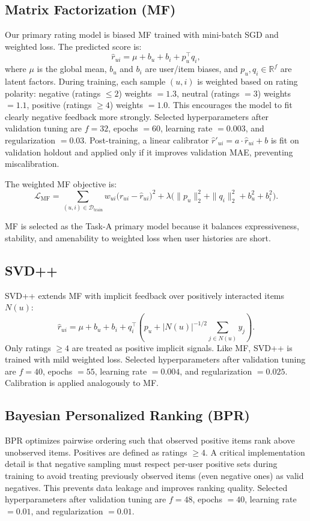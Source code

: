 \documentclass[sigconf,nonacm]{acmart}
\begin{document}
\subsection{Matrix Factorization (MF)}
Our primary rating model is biased MF trained with mini-batch SGD and weighted loss. The predicted score is:
\begin{equation}
\hat{r}_{ui} = \mu + b_u + b_i + p_u^\top q_i,
\end{equation}
where $\mu$ is the global mean, $b_u$ and $b_i$ are user/item biases, and $p_u, q_i \in \mathbb{R}^f$ are latent factors. During training, each sample $(u,i)$ is weighted based on rating polarity: negative (ratings $\le 2$) weights $=1.3$, neutral (ratings $=3$) weights $=1.1$, positive (ratings $\ge 4$) weights $=1.0$. This encourages the model to fit clearly negative feedback more strongly. Selected hyperparameters after validation tuning are $f=32$, epochs $=60$, learning rate $=0.003$, and regularization $=0.03$. Post-training, a linear calibrator $\hat{r}'_{ui} = a \cdot \hat{r}_{ui} + b$ is fit on validation holdout and applied only if it improves validation MAE, preventing miscalibration.

The weighted MF objective is:
\begin{equation}
\mathcal{L}_{\text{MF}} =
\sum_{(u,i)\in\mathcal{D}_{\text{train}}}
w_{ui}\big(r_{ui}-\hat{r}_{ui}\big)^2
+ \lambda\Big(\|p_u\|_2^2 + \|q_i\|_2^2 + b_u^2 + b_i^2\Big).
\end{equation}

MF is selected as the Task-A primary model because it balances expressiveness, stability, and amenability to weighted loss when user histories are short.

\subsection{SVD++}
SVD++ extends MF with implicit feedback over positively interacted items $N(u)$:
\begin{equation}
\hat{r}_{ui} = \mu + b_u + b_i + q_i^\top\left(p_u + |N(u)|^{-1/2}\sum_{j\in N(u)} y_j\right).
\end{equation}
Only ratings $\ge 4$ are treated as positive implicit signals. Like MF, SVD++ is trained with mild weighted loss. Selected hyperparameters after validation tuning are $f=40$, epochs $=55$, learning rate $=0.004$, and regularization $=0.025$. Calibration is applied analogously to MF.

\subsection{Bayesian Personalized Ranking (BPR)}
BPR optimizes pairwise ordering such that observed positive items rank above unobserved items. Positives are defined as ratings $\ge 4$. A critical implementation detail is that negative sampling must respect per-user positive sets during training to avoid treating previously observed items (even negative ones) as valid negatives. This prevents data leakage and improves ranking quality. Selected hyperparameters after validation tuning are $f=48$, epochs $=40$, learning rate $=0.01$, and regularization $=0.01$.
\end{document}

